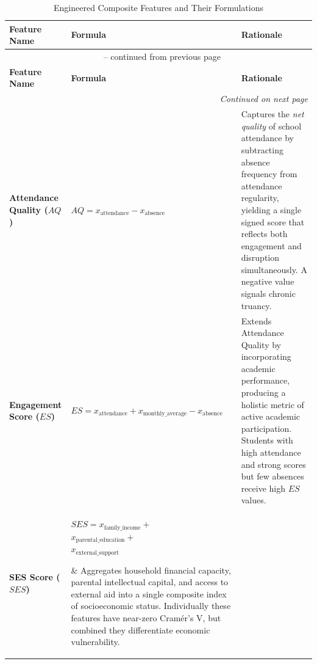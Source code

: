 \begin{longtable}{|p{2.8cm}|p{5.0cm}|p{7.8cm}|}
    \caption{Engineered Composite Features and Their Formulations}
    \label{tab:feature_engineering_table} \\
    \hline
    \rowcolor{gray!20}
    \textbf{Feature Name} &
    \textbf{Formula} &
    \textbf{Rationale} \\
    \hline
    \endfirsthead

    \multicolumn{3}{c}{\tablename~\thetable{} -- continued from previous page} \\
    \hline
    \rowcolor{gray!20}
    \textbf{Feature Name} &
    \textbf{Formula} &
    \textbf{Rationale} \\
    \hline
    \endhead

    \hline \multicolumn{3}{r}{\textit{Continued on next page}} \\
    \endfoot

    \hline
    \endlastfoot

    \textbf{Attendance Quality ($AQ$)} &
    $AQ = x_{\text{attendance}} - x_{\text{absence}}$ &
    Captures the \textit{net quality} of school attendance by subtracting absence frequency from attendance regularity, yielding a single signed score that reflects both engagement and disruption simultaneously. A negative value signals chronic truancy. \\
    \hline

    \textbf{Engagement Score ($ES$)} &
    $ES = x_{\text{attendance}} + x_{\text{monthly\_average}} - x_{\text{absence}}$ &
    Extends Attendance Quality by incorporating academic performance, producing a holistic metric of active academic participation. Students with high attendance and strong scores but few absences receive high $ES$ values. \\
    \hline

    \textbf{SES Score ($SES$)} &
    \parbox{4.8cm}{\vspace{0.1cm}\raggedright $SES = x_{\text{family\_income}} +$\\ $x_{\text{parental\_education}} +$\\ $x_{\text{external\_support}}$\vspace{0.1cm}} &
    Aggregates household financial capacity, parental intellectual capital, and access to external aid into a single composite index of socioeconomic status. Individually these features have near-zero Cram\'{e}r's V, but combined they differentiate economic vulnerability. \\
    \hline


\end{longtable}
